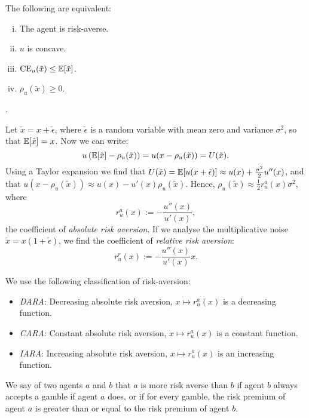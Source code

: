 \documentclass[twoside]{article}
\begin{document}
\begin{proposition}
    The following are equivalent:
    \begin{enumerate}[(i)]
        \item The agent is risk-averse.
        \item $u$ is concave.
        \item $\text{CE}_u(\tilde{x}) \leq \mathbb{E}[\tilde{x}]$.
        \item $\rho_u(\tilde{x}) \geq 0$.
    \end{enumerate}
    \begin{explanation}
        .
    \end{explanation}
\end{proposition}
Let $\tilde{x} = x + \tilde{\epsilon}$, where $\tilde{\epsilon}$ is a random variable with mean zero and variance $\sigma^2$, so that $\mathbb{E}[\tilde{x}] = x$. Now we can write:
\[
    u\left(\mathbb{E}[\tilde{x}] - \rho_u(\tilde{x})\right) = u(x - \rho_u(\tilde{x})) = U(\tilde{x}).
\]
Using a Taylor expansion we find that $U(\tilde{x}) = \mathbb{E}[u(x + \tilde{\epsilon})] \approx u(x) + \frac{\sigma^2}{2}u''(x)$, and that $u(x - \rho_u(\tilde{x}))  \approx u(x) - u'(x)\rho_u(\tilde{x})$. Hence, $\rho_u(\tilde{x}) \approx \frac{1}{2} r^a_u(x)\sigma^2$, where
\[
    r^a_u(x) := -\frac{u''(x)}{u'(x)},
\]
the coefficient of \textit{absolute risk aversion}. If we analyse the multiplicative noise $\tilde{x} = x(1 + \tilde{\epsilon})$, we find the coefficient of \textit{relative risk aversion}:
\[
    r^r_u(x) := -\frac{u''(x)}{u'(x)}x.
\]

We use the following classification of risk-aversion:
\begin{itemize}
    \item \textit{DARA}: Decreasing absolute risk aversion, $x \mapsto r^a_u(x)$ is a decreasing function.
    \item \textit{CARA}: Constant absolute risk aversion, $x \mapsto r^a_u(x)$ is a constant function.
    \item \textit{IARA}: Increasing absolute risk aversion, $x \mapsto r^a_u(x)$ is an increasing function.
\end{itemize}
We say of two agents $a$ and $b$ that $a$ is more risk averse than $b$ if agent $b$ always accepts a gamble if agent $a$ does, or if for every gamble, the risk premium of agent $a$ is greater than or equal to the risk premium of agent $b$.

\end{document}
